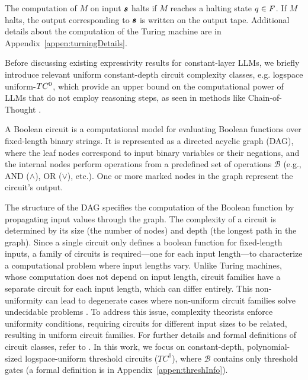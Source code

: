 The computation of $M$ on input $\pmb{s}$ halts if $M$ reaches a halting state $q \in F $. If $M$ halts, the output corresponding to $\pmb{s}$ is written on the output tape. Additional details about the computation of the Turing machine are in Appendix~\ref{appen:turningDetails}.


Before discussing existing expressivity results for constant-layer LLMs, we briefly introduce relevant uniform constant-depth circuit complexity classes, e.g. logspace uniform-$TC^{0}$, which provide an upper bound on the computational power of LLMs that do not employ reasoning steps, as seen in methods like Chain-of-Thought \cite{cotGoogle}. 
\begin{definition}
A Boolean circuit is a computational model for evaluating Boolean functions over fixed-length binary strings. It is represented as a directed acyclic graph (DAG), where the leaf nodes correspond to input binary variables or their negations, and the internal nodes perform operations from a predefined set of operations $\mathcal{B}$ (e.g., AND ($\wedge$), OR ($\vee$), etc.). One or more marked nodes in the graph represent the circuit's output.
\end{definition}
The structure of the DAG specifies the computation of the Boolean function by propagating input values through the graph.
The complexity of a circuit is determined by its size (the number of nodes) and depth (the longest path in the graph). 
Since a single circuit only defines a boolean function for fixed-length inputs, a family of circuits is required—one for each input length—to characterize a computational problem where input lengths vary. 
Unlike Turing machines, whose computation does not depend on input length, circuit families have a separate circuit for each input length, which can differ entirely. 
This non-uniformity can lead to degenerate cases where non-uniform circuit families solve undecidable problems \cite{complexityBook}.
To address this issue, complexity theorists enforce uniformity conditions, requiring circuits for different input sizes to be related, resulting in uniform circuit families. For further details and formal definitions of circuit classes, refer to \cite{complexityBook}. In this work, we focus on constant-depth, polynomial-sized logspace-uniform threshold circuits ($TC^{0}$), where $\mathcal{B}$ contains only threshold gates (a formal definition is  in Appendix~\ref{appen:threshInfo}). 

 


